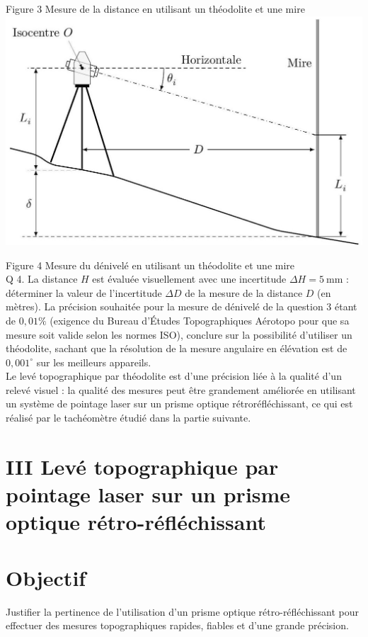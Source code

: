 \documentclass[10pt]{article}
\begin{document}
Figure 3 Mesure de la distance en utilisant un théodolite et une mire\\
\includegraphics[max width=\textwidth, center]{2024_12_07_51b7f57c7f055c2d8d29g-03}

Figure 4 Mesure du dénivelé en utilisant un théodolite et une mire\\
Q 4. La distance $H$ est évaluée visuellement avec une incertitude $\Delta H=5 \mathrm{~mm}$ : déterminer la valeur de l'incertitude $\Delta D$ de la mesure de la distance $D$ (en mètres). La précision souhaitée pour la mesure de dénivelé de la question 3 étant de $0,01 \%$ (exigence du Bureau d'Études Topographiques Aérotopo pour que sa mesure soit valide selon les normes ISO), conclure sur la possibilité d'utiliser un théodolite, sachant que la résolution de la mesure angulaire en élévation est de $0,001^{\circ}$ sur les meilleurs appareils.\\
Le levé topographique par théodolite est d'une précision liée à la qualité d'un relevé visuel : la qualité des mesures peut être grandement améliorée en utilisant un système de pointage laser sur un prisme optique rétroréfléchissant, ce qui est réalisé par le tachéomètre étudié dans la partie suivante.

\section*{III Levé topographique par pointage laser sur un prisme optique rétro-réfléchissant}
\section*{Objectif}
Justifier la pertinence de l'utilisation d'un prisme optique rétro-réfléchissant pour effectuer des mesures topographiques rapides, fiables et d'une grande précision.
\end{document}
